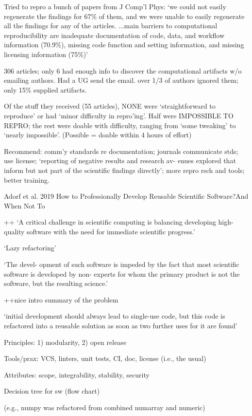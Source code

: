 \documentclass[12pt]{amsart}
\begin{document}
Tried to repro a bunch of papers from J Comp'l Phys: `we could not easily regenerate the findings for 67\% of them, and we were unable to easily regenerate all the findings for any of the articles. ...main barriers to computational reproducibility are inadequate documentation of code, data, and workflow information (70.9\%), missing code function and setting information, and missing licensing information (75\%)'

306 articles; only 6 had enough info to discover the computational artifacts w/o emailing authors. Had a UG send the email. over 1/3 of authors ignored them; only 15\% supplied artifacts.

Of the stuff they received (55 articles), NONE were `straightforward to reproduce' or had `minor difficulty in repro'ing'. Half were IMPOSSIBLE TO REPRO; the rest were doable with difficulty, ranging from `some tweaking' to `nearly impossible'. (Possible = doable within 4 hours of effort)

Recommend: comm'y standards re documentation; journals communicate stds; use license; `reporting of negative results and research av- enues explored that inform but not part of the scientific findings directly'; more repro rsch and tools; better training.


Adorf et al. 2019 How to Professionally Develop Reusable Scientific Software?And When Not To

++ `A critical challenge in scientific computing is balancing developing high-quality software with the need for immediate scientific progress.'

`Lazy refactoring'

`The devel- opment of such software is impeded by the fact that most scientific software is developed by non- experts for whom the primary product is not the software, but the resulting science.'

++nice intro summary of the problem

`initial development should always lead to single-use code, but this code is refactored into a reusable solution as soon as two further uses for it are found'

Principles: 1) modularity, 2) open release

Tools/prax: VCS, linters, unit tests, CI, doc, license (i.e., the usual)

Attributes: scope, integrability, stability, security

Decision tree for sw (flow chart)

 (e.g., numpy was refactored from combined numarray and numeric)
\end{document}
